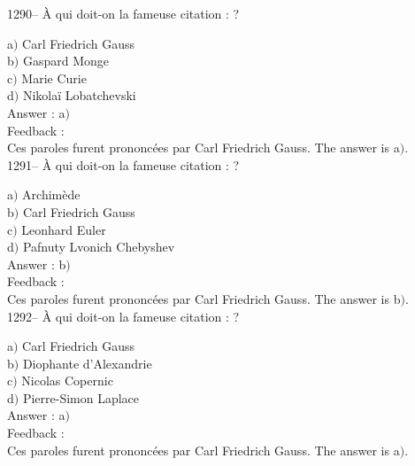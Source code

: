 \documentclass[letterpaper, 12pt]{article}
\begin{document}
1290-- \`A qui doit-on la fameuse citation : \fg ?

a$)$ Carl Friedrich Gauss \\
b$)$ Gaspard Monge \\
c$)$ Marie Curie \\
d$)$ Nikola\"i Lobatchevski\\

Answer : a$)$\\

Feedback :\\
Ces paroles furent prononc\'ees par Carl Friedrich
Gauss.
The answer is  a$)$.\\

1291-- \`A qui doit-on la fameuse citation : \fg?

a$)$ Archim\`ede \\
b$)$ Carl Friedrich Gauss \\
c$)$ Leonhard Euler \\
d$)$ Pafnuty Lvonich Chebyshev\\

Answer : b$)$\\

Feedback : \\
Ces paroles furent prononc\'ees par Carl Friedrich Gauss.
The answer is  b$)$.\\

1292-- \`A qui doit-on la fameuse citation : \fg ?

a$)$ Carl Friedrich Gauss \\
b$)$ Diophante d'Alexandrie \\
c$)$ Nicolas Copernic \\
d$)$ Pierre-Simon Laplace\\

Answer : a$)$\\

Feedback : \\
Ces paroles furent prononc\'ees par Carl Friedrich Gauss.
The answer is  a$)$.\\
\end{document}
